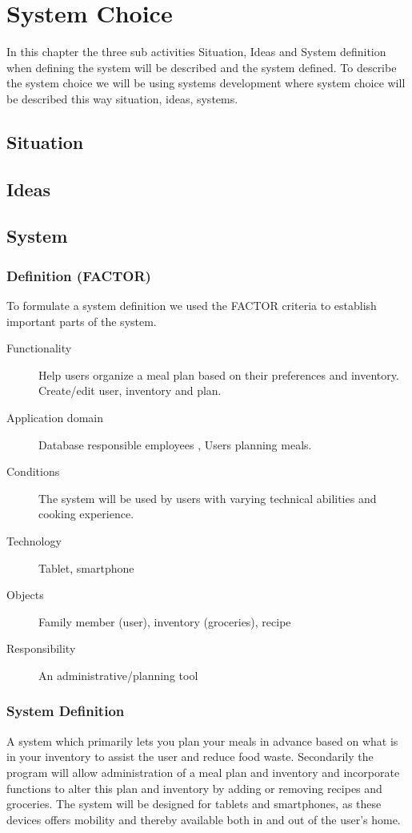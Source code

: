 \chapter{System Choice}
In this chapter the three sub activities Situation, Ideas and System definition when defining the system will be described and the system defined.
To describe the system choice we will be using systems development where system choice will be described this way situation, ideas, systems.

\section{Situation}


\section{Ideas}


\section{System}
\subsection{Definition (FACTOR)}
To formulate a system definition we used the FACTOR \cite{OOAD_BATOF} criteria to establish important parts of the system.

\begin{description}
	\item[Functionality] Help users organize a meal plan based on their preferences and inventory. Create/edit user, inventory and plan.
	\item[Application domain] Database responsible employees , Users planning meals.
	\item[Conditions] The system will be used by users with varying technical abilities and cooking experience.
	\item[Technology] Tablet, smartphone
	\item[Objects] Family member (user), inventory (groceries), recipe
	\item[Responsibility] An administrative/planning tool
\end{description}

\subsection{System Definition}
A system which primarily lets you plan your meals in advance based on what is in your inventory to assist the user and reduce food waste.
Secondarily the program will allow administration of a meal plan and inventory and incorporate functions to alter this plan and inventory by adding or removing recipes and groceries.
The system will be designed for tablets and smartphones, as these devices offers mobility and thereby available both in and out of the user's home.